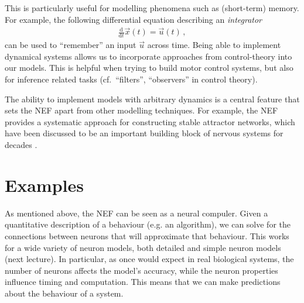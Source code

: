 \documentclass[10pt,letterpaper,oneside]{article}
\begin{document}
This is particularly useful for modelling phenomena such as (short-term) memory. For example, the following differential equation describing an \emph{integrator}
\begin{align*}
	\frac{\mathrm{d}}{\mathrm{d}t} \vec x(t) = \vec u(t) \,,
\end{align*}
can be used to \enquote{remember} an input $\vec u$ across time. Being able to implement dynamical systems allows us to incorporate approaches from control-theory into our models. This is helpful when trying to build motor control systems, but also for inference related tasks (cf.~\enquote{filters}, \enquote{observers} in control theory).

The ability to implement models with arbitrary dynamics is a central feature that sets the NEF apart from other modelling techniques. For example, the NEF provides a systematic approach for constructing stable attractor networks, which have been discussed to be an important building block of nervous systems for decades \cite{eliasmith2005unified}.


\section{Examples}
\label{sec:examples}

As mentioned above, the NEF can be seen as a neural compuler. Given a quantitative description of a behaviour (e.g. an algorithm), we can solve for the connections between neurons that will approximate that behaviour. This works for a wide variety of neuron models, both detailed and simple neuron models (next lecture). In particular, as once would expect in real biological systems, the number of neurons affects the model's accuracy, while the neuron properties influence timing and computation. This means that we can make predictions about the behaviour of a system.
\end{document}
